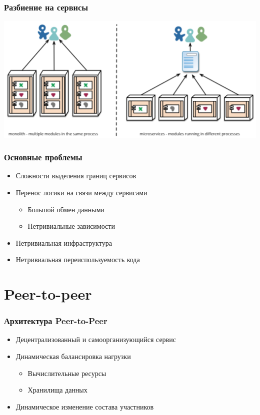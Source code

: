 \documentclass[xetex,mathserif,serif]{beamer}
\begin{document}
    \begin{frame}
        \frametitle{Разбиение на сервисы}
        \begin{center}
            \includegraphics[width=\textwidth]{microservices.png}
        \end{center}
    \end{frame}

    \begin{frame}
        \frametitle{Основные проблемы}
        \begin{itemize}
            \item Сложности выделения границ сервисов
            \item Перенос логики на связи между сервисами
            \begin{itemize}
                \item Большой обмен данными
                \item Нетривиальные зависимости
            \end{itemize}
            \item Нетривиальная инфраструктура
            \item Нетривиальная переиспользуемость кода
        \end{itemize}
    \end{frame}

    \section{Peer-to-peer}

    \begin{frame}
        \frametitle{Архитектура Peer-to-Peer}
        \begin{itemize}
            \item Децентрализованный и самоорганизующийся сервис
            \item Динамическая балансировка нагрузки
            \begin{itemize}
                \item Вычислительные ресурсы
                \item Хранилища данных
            \end{itemize}
            \item Динамическое изменение состава участников
        \end{itemize}
    \end{frame}
\end{document}
